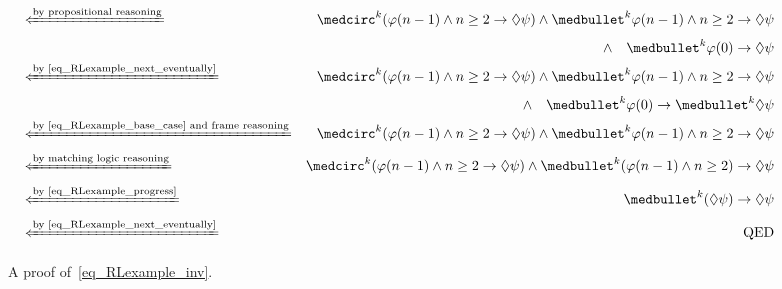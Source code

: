 \documentclass[letter,12pt]{article}
\newcommand{\imp}{\to}
\newcommand{\xif}[1]{\xLeftarrow{\text{#1}}}
\newcommand{\wnext}{{\medcirc}}
\newcommand{\snext}{{\medbullet}}
\newcommand{\eventually}{{\lozenge}}
\newcommand{\QED}{\text{QED}}
\begin{document}
\begin{figure}
{\begin{align*}
\\
&\xif{by propositional reasoning}&
\wnext^k  (\varphi(n-1) \wedge n \ge 2 \imp \eventually \psi)
\wedge \snext^k \varphi(n-1) \wedge n \ge 2 \imp \eventually \psi
\\&&
\wedge\quad
\snext^k \varphi(0) \imp \eventually \psi
\\
&\xif{by~\eqref{eq_RLexample_next_eventually}}&
\wnext^k  (\varphi(n-1) \wedge n \ge 2 \imp \eventually \psi)
\wedge \snext^k \varphi(n-1) \wedge n \ge 2 \imp \eventually \psi
\\&&
\wedge\quad
\snext^k \varphi(0) \imp \snext^k \eventually \psi
\\
&\xif{by~\eqref{eq_RLexample_base_case} and frame reasoning}&
\wnext^k  (\varphi(n-1) \wedge n \ge 2 \imp \eventually \psi)
\wedge \snext^k \varphi(n-1) \wedge n \ge 2 \imp \eventually \psi
\\
&\xif{by matching logic reasoning}&
\wnext^k  (\varphi(n-1) \wedge n \ge 2 \imp \eventually \psi)
\wedge \snext^k (\varphi(n-1) \wedge n \ge 2) \imp \eventually \psi
\\
&\xif{by~\eqref{eq_RLexample_progress}}&
\snext^k  (\eventually \psi) \imp \eventually \psi
\\
&\xif{by~\eqref{eq_RLexample_next_eventually}}&
\QED
\end{align*}
}
\caption{A proof of~\eqref{eq_RLexample_inv}.}
\label{fig_RLexample_proof}
\end{figure}
\end{document}

